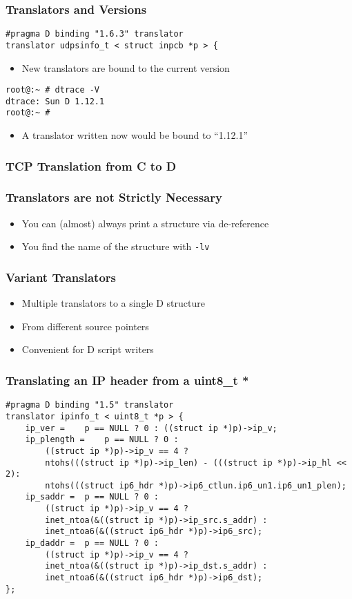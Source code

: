 \documentclass[pdftex]{beamer}
\begin{document}
\begin{frame}
  \frametitle{Translators and Versions}
\begin{lstlisting}
#pragma D binding "1.6.3" translator
translator udpsinfo_t < struct inpcb *p > {
\end{lstlisting}
  \begin{itemize}
  \item New translators are bound to the current version
  \end{itemize}
\begin{lstlisting}
root@:~ # dtrace -V
dtrace: Sun D 1.12.1
root@:~ #
\end{lstlisting}
  \begin{itemize}
  \item A translator written now would be bound to ``1.12.1''
  \end{itemize}
\end{frame}

\begin{frame}
  \frametitle{TCP Translation from C to D}
  
\end{frame}

\begin{frame}[fragile]
  \frametitle{Translators are not Strictly Necessary}
  \begin{itemize}
  \item You can (almost) always print a structure via de-reference
  \item You find the name of the structure with \verb|-lv|
  \end{itemize}
\end{frame}

\begin{frame}
  \frametitle{Variant Translators}
  \begin{itemize}
  \item Multiple translators to a single D structure
  \item From different source pointers
  \item Convenient for D script writers
  \end{itemize}
\end{frame}

\begin{frame}[fragile]
  \frametitle{Translating an IP header from a uint8\_t *}
\begin{lstlisting}
#pragma D binding "1.5" translator
translator ipinfo_t < uint8_t *p > {
	ip_ver =	p == NULL ? 0 : ((struct ip *)p)->ip_v;
	ip_plength =	p == NULL ? 0 :
	    ((struct ip *)p)->ip_v == 4 ?
	    ntohs(((struct ip *)p)->ip_len) - (((struct ip *)p)->ip_hl << 2):
	    ntohs(((struct ip6_hdr *)p)->ip6_ctlun.ip6_un1.ip6_un1_plen);
	ip_saddr =	p == NULL ? 0 :
	    ((struct ip *)p)->ip_v == 4 ?
	    inet_ntoa(&((struct ip *)p)->ip_src.s_addr) :
	    inet_ntoa6(&((struct ip6_hdr *)p)->ip6_src);
	ip_daddr =	p == NULL ? 0 :
	    ((struct ip *)p)->ip_v == 4 ?
	    inet_ntoa(&((struct ip *)p)->ip_dst.s_addr) :
	    inet_ntoa6(&((struct ip6_hdr *)p)->ip6_dst);
};
\end{lstlisting}
\end{frame}
\end{document}
